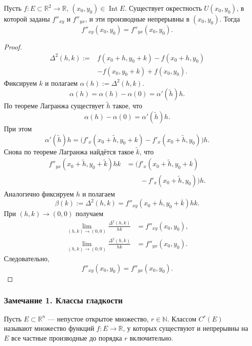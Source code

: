 \label{ticket:01}

\begin{theorem}
Пусть $f:E\subset\mathbb R^2\to\mathbb R$, $(x_0,y_0)\in\operatorname{Int}E$.
Существует окрестность $U(x_0,y_0)$, в которой заданы $f''_{xy}$ и $f''_{yx}$, и эти производные непрерывны в $(x_0,y_0)$.
Тогда
\[
  f''_{xy}(x_0,y_0)=f''_{yx}(x_0,y_0).
\]
\end{theorem}

\begin{proof}
\[
  \begin{aligned}
    \Delta^2(h,k):={}&f(x_0+h,y_0+k)-f(x_0+h,y_0)\\
                    &-f(x_0,y_0+k)+f(x_0,y_0).
  \end{aligned}
\]
Фиксируем $k$ и полагаем $\alpha(h):=\Delta^2(h,k)$.
\[
  \alpha(h)=\alpha(h)-\alpha(0)=\alpha'(\tilde h)h.
\]
По теореме Лагранжа существует $\tilde h$ такое, что
\[
  \alpha(h)-\alpha(0)=\alpha'(\tilde h)h.
\]
При этом
\[
  \alpha'(\tilde h)h
  =\bigl(f'_x(x_0+\tilde h,y_0+k)-f'_x(x_0+\tilde h,y_0)\bigr)h.
\]
Снова по теореме Лагранжа найдётся такое $\tilde k$, что
\[
  \begin{aligned}
    f''_{yx}(x_0+\tilde h,y_0+\tilde k)hk
      &={}\bigl(f'_x(x_0+\tilde h,y_0+k)\\
      &\qquad-f'_x(x_0+\tilde h,y_0)\bigr)h.
  \end{aligned}
\]
Аналогично фиксируем $h$ и полагаем
\[
  \beta(k):=\Delta^2(h,k)
  =f''_{xy}(x_0+\overline h,y_0+\overline k)hk.
\]
При $(h,k)\to(0,0)$ получаем
\[
  \begin{aligned}
    \lim_{(h,k)\to(0,0)}\frac{\Delta^2(h,k)}{hk}
      &=f''_{xy}(x_0,y_0),\\
    \lim_{(h,k)\to(0,0)}\frac{\Delta^2(h,k)}{hk}
      &=f''_{yx}(x_0,y_0).
  \end{aligned}
\]
Следовательно,
\[
  f''_{xy}(x_0,y_0)=f''_{yx}(x_0,y_0).
\]
\end{proof}

\subsubsection*{Замечание 1. Классы гладкости}

Пусть $E\subset\mathbb R^n$ --- непустое открытое множество, $r\in\mathbb N$.
Классом $C^r(E)$ называют множество функций $f:E\to\mathbb R$, у которых существуют и непрерывны на $E$ все частные производные до порядка $r$ включительно.

